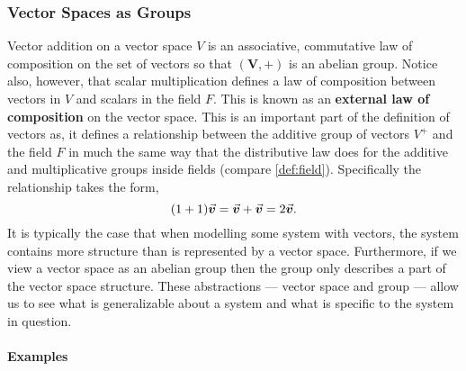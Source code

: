 \documentclass[MathsNotesBase.tex]{subfiles}
\begin{document}
{		\bigskip
		\subsubsection{Vector Spaces as Groups}
		\bigskip
		Vector addition  on a vector space $V$ is an associative, commutative law of composition on the set of vectors so that ${\bm{ (V, +) }}$ is an abelian group. Notice also, however, that scalar multiplication defines a law of composition between vectors in $V$ and scalars in the field $F$. This is known as an \textbf{external law of composition} on the vector space. This is an important part of the definition of vectors as, it defines a relationship between the additive group of vectors $V^+$ and the field $F$ in much the same way that the distributive law does for the additive and multiplicative groups inside fields (compare \ref{def:field}). Specifically the relationship takes the form,
			\[ (1 + 1)\vec{\bm{v}} = \vec{\bm{v}} + \vec{\bm{v}} = 2\vec{\bm{v}}. \]
		It is typically the case that when modelling some system with vectors, the system contains more structure than is represented by a vector space. Furthermore, if we view a vector space as an abelian group then the group only describes a part of the vector space structure. These abstractions --- vector space and group --- allow us to see what is generalizable about a system and what is specific to the system in question.
	
	
		\bigskip\bigskip
	
		\medskip
		\paragraph{Examples}
		\begin{exe}
		\end{exe}
	}
	
	
	
\end{document}
